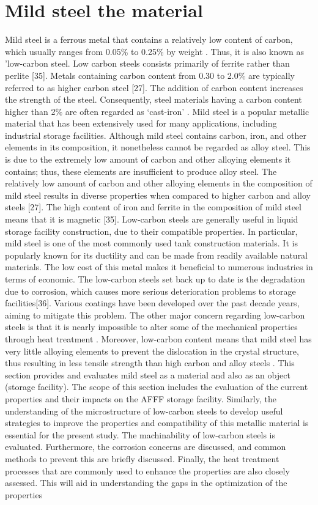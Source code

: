 \documentclass[12pt]{report}
\begin{document}
\section{Mild steel the material}
Mild steel is a ferrous metal that contains a relatively low content of carbon, which usually ranges from 0.05\% to 0.25\% by weight \cite{callister2018materials}. Thus, it is also known as 'low-carbon steel.  Low carbon steels consists primarily of ferrite rather than perlite [35]. Metals containing carbon content from 0.30 to 2.0\% are typically referred to as higher carbon steel [27]. The addition of carbon content increases the strength of the steel. Consequently, steel materials having a carbon content higher than 2\% are often regarded as ‘cast-iron' \cite{callister2018materials}.  Mild steel is a popular metallic material that has been extensively used for many applications, including industrial storage facilities.
Although mild steel contains carbon, iron, and other elements in its composition, it nonetheless cannot be regarded as alloy steel. This is due to the extremely low amount of carbon and other alloying elements it contains; thus, these elements are insufficient to produce alloy steel. The relatively low amount of carbon and other alloying elements in the composition of mild steel results in diverse properties when compared to higher carbon and alloy steels [27]. The high content of iron and ferrite in the composition of mild steel means that it is magnetic [35].
Low-carbon steels are generally useful in liquid storage facility construction, due to their compatible properties. In particular, mild steel is one of the most commonly used tank construction materials. It is popularly known for its ductility and can be made from readily available natural materials. The low cost of this metal makes it beneficial to numerous industries in terms of economic.
The low-carbon steels set back up to date is the degradation due to corrosion, which causes more serious deterioration problems to storage facilities[36]. Various coatings have been developed over the past decade years, aiming to mitigate this problem. The other major concern regarding low-carbon steels is that it is nearly impossible to alter some of the mechanical properties through heat treatment \cite{callister2018materials}. Moreover, low-carbon content means that mild steel has very little alloying elements to prevent the dislocation in the crystal structure, thus resulting in less tensile strength than high carbon and alloy steels \cite{callister2018materials}.
This section provides and evaluates mild steel as a material and also as an object (storage facility). The scope of this section includes the evaluation of the current properties and their impacts on the AFFF storage facility. Similarly, the understanding of the microstructure of low-carbon steels to develop useful strategies to improve the properties and compatibility of this metallic material is essential for the present study. The machinability of low-carbon steels is evaluated. Furthermore, the corrosion concerns are discussed, and common methods to prevent this are briefly discussed. Finally, the heat treatment processes that are commonly used to enhance the properties are also closely assessed. This will aid in understanding the gaps in the optimization of the properties
\end{document}
